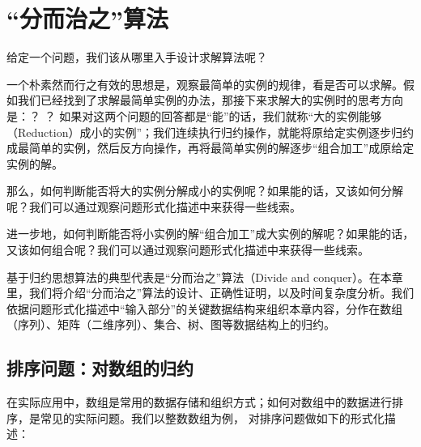 \chapter{“分而治之”算法}


 给定一个问题，我们该从哪里入手设计求解算法呢？

   一个朴素然而行之有效的思想是，观察最简单的实例的规律，看是否可以求解。假如我们已经找到了求解最简单实例的办法，那接下来求解大的实例时的思考方向是：？ ？ 如果对这两个问题的回答都是“能”的话，我们就称“大的实例能够（Reduction）成小的实例”；我们连续执行归约操作，就能将原给定实例逐步归约成最简单的实例，然后反方向操作，再将最简单实例的解逐步“组合加工”成原给定实例的解。
    
那么，如何判断能否将大的实例分解成小的实例呢？如果能的话，又该如何分解呢？我们可以通过观察问题形式化描述中来获得一些线索。
   
   进一步地，如何判断能否将小实例的解“组合加工”成大实例的解呢？如果能的话，又该如何组合呢？我们可以通过观察问题形式化描述中来获得一些线索。
   	
	基于归约思想算法的典型代表是“分而治之”算法（{Divide and conquer}）。在本章里，我们将介绍“分而治之”算法的设计、正确性证明，以及时间复杂度分析。我们依据问题形式化描述中“输入部分”的关键数据结构来组织本章内容，分作在数组（序列）、矩阵（二维序列）、集合、树、图等数据结构上的归约。
	
\section{排序问题：对数组的归约}

在实际应用中，数组是常用的数据存储和组织方式；如何对数组中的数据进行排序，是常见的实际问题。我们以整数数组为例， 对排序问题做如下的形式化描述：

\begin{center}
\end{center}

